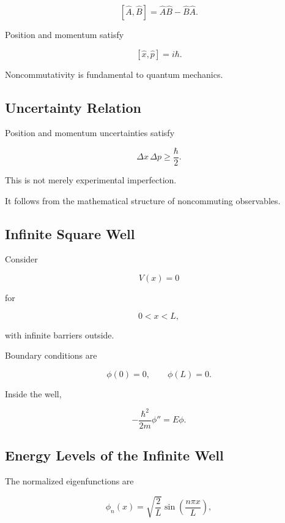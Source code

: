 \[
\boxed{
[\hat A,\hat B]
=
\hat A\hat B-\hat B\hat A.
}
\]

Position and momentum satisfy

\[
\boxed{
[\hat x,\hat p]
=
i\hbar.
}
\]

Noncommutativity is fundamental to quantum mechanics.

\subsection{Uncertainty Relation}
\label{subsec:quantum-uncertainty}

Position and momentum uncertainties satisfy

\[
\boxed{
\Delta x\,\Delta p
\geq
\frac{\hbar}{2}.
}
\]

This is not merely experimental imperfection.

It follows from the mathematical structure of noncommuting observables.

\subsection{Infinite Square Well}
\label{subsec:infinite-square-well}

Consider

\[
V(x)=0
\]

for

\[
0<x<L,
\]

with infinite barriers outside.

Boundary conditions are

\[
\boxed{
\phi(0)=0,
\qquad
\phi(L)=0.
}
\]

Inside the well,

\[
-\frac{\hbar^2}{2m}\phi''
=
E\phi.
\]

\subsection{Energy Levels of the Infinite Well}
\label{subsec:infinite-well-energy-levels}

The normalized eigenfunctions are

\[
\boxed{
\phi_n(x)
=
\sqrt{\frac{2}{L}}
\sin
\left(
\frac{n\pi x}{L}
\right),
}
\]

